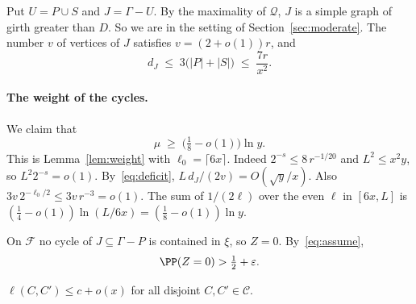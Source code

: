 Put $U=P\cup S$ and $J=\Gamma-U$. By the maximality of $\mathcal{Q}$, $J$ is a simple graph of
girth greater than $D$. So we are in the setting of Section~\ref{sec:moderate}. The number $v$ of
vertices of $J$ satisfies $v=(2+o(1))r$, and
\begin{equation}\label{eq:deficit}
  d_J\;\le\;3\bigl(|P|+|S|\bigr)\;\le\;\frac{7r}{x^{2}} .
\end{equation}

\paragraph{The weight of the cycles.}
We claim that
\begin{equation}\label{eq:mu}
  \mu\;\ge\;\bigl(\tfrac18-o(1)\bigr)\ln y .
\end{equation}
This is Lemma~\ref{lem:weight} with $\ell_0=\lceil6x\rceil$. Indeed $2^{-s}\le8\,r^{-1/20}$ and
$L^{2}\le x^{2}y$, so $L^{2}2^{-s}=o(1)$. By~\eqref{eq:deficit}, $L\,d_J/(2v)=O(\sqrt y/x)$. Also
$3v\,2^{-\ell_0/2}\le3v\,r^{-3}=o(1)$. The sum of $1/(2\ell)$ over the even $\ell$ in $[6x,L]$ is
$(\frac14-o(1))\ln(L/6x)=(\frac18-o(1))\ln y$.

On $\mathcal{F}$ no cycle of $J\subseteq\Gamma-P$ is contained in $\xi$, so $Z=0$. By~\eqref{eq:assume},
\begin{equation}\label{eq:Zzero}
  \PP(Z=0)>\tfrac12+\varepsilon .
\end{equation}

\begin{lemma}\label{lem:links}
$\ell(C,C')\le c+o(x)$ for all disjoint $C,C'\in\mathcal{C}$.
\end{lemma}


